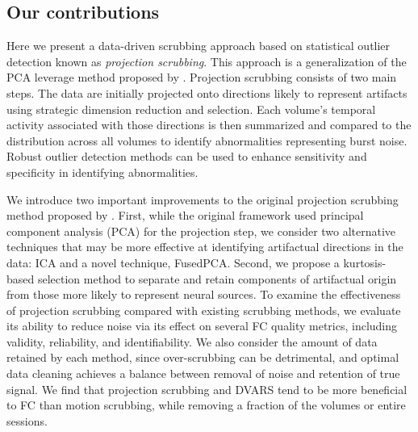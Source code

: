 \documentclass{article}
\begin{document}
\subsection{Our contributions}

Here we present a data-driven scrubbing approach based on statistical outlier detection known as \textit{projection scrubbing}. This approach is a generalization of the PCA leverage method proposed by \cite{mejiaPCALeverageOutlier2017}. Projection scrubbing consists of two main steps. The data are initially projected onto directions likely to represent artifacts using strategic dimension reduction and selection. Each volume's temporal activity associated with those directions is then summarized and compared to the distribution across all volumes to identify abnormalities representing burst noise. Robust outlier detection methods can be used to enhance sensitivity and specificity in identifying abnormalities. 

We introduce two important improvements to the original projection scrubbing method proposed by \cite{mejiaPCALeverageOutlier2017}. First, while the original framework used principal component analysis (PCA) for the projection step, we consider two alternative techniques that may be more effective at identifying artifactual directions in the data: ICA and a novel technique, FusedPCA. Second, we propose a kurtosis-based selection method to separate and retain components of artifactual origin from those more likely to represent neural sources.  
To examine the effectiveness of projection scrubbing compared with existing scrubbing methods, we evaluate its ability to reduce noise via its effect on several FC quality metrics, including validity, reliability, and identifiability. We also consider the amount of data retained by each method, since over-scrubbing can be detrimental, and optimal data cleaning achieves a balance between removal of noise and retention of true signal. We find that projection scrubbing and DVARS tend to be more beneficial to FC than motion scrubbing, while removing a fraction of the volumes or entire sessions. 

\end{document}
